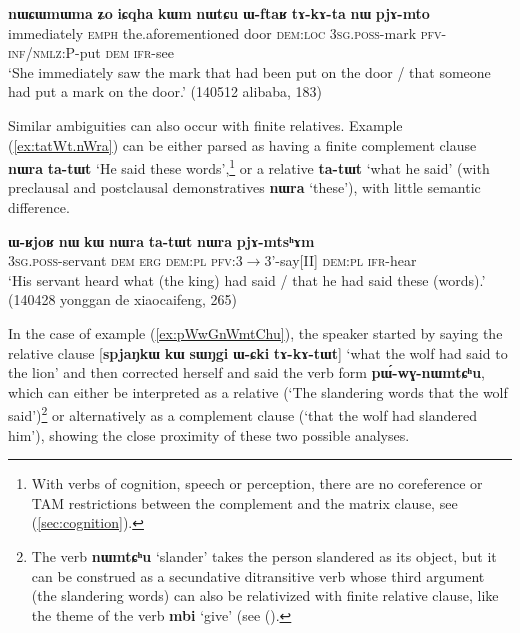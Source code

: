 \documentclass[oneside,a4paper,11pt]{article}
\newcommand{\ipa}[1]{\textbf{\phon#1}} %
\newcommand{\jpg}[2]{\ipa{#1} `#2'} %
\begin{document}
\begin{exe}
\ex  \label{ex:WftaR.tAkAta}
\gll 
\ipa{nɯɕɯmɯma} 	\ipa{ʑo} 	\ipa{iɕqha} 	\ipa{kɯm} 	\ipa{nɯtɕu} 	\ipa{ɯ-ftaʁ} 	\ipa{tɤ-kɤ-ta} 	\ipa{nɯ} 	\ipa{pjɤ-mto} \\
immediately \textsc{emph} the.aforementioned door \textsc{dem:loc} \textsc{3sg.poss}-mark \textsc{pfv-inf/nmlz:P}-put \textsc{dem} \textsc{ifr}-see \\
\glt `She immediately saw the mark that had been put on the door / that someone had put a mark on the door.' (140512 alibaba, 183)
\end{exe}

Similar ambiguities can also occur with finite relatives. Example (\ref{ex:tatWt.nWra}) can be either parsed as having a finite complement clause \ipa{nɯra} 	\ipa{ta-tɯt} `He said these words',\footnote{With verbs of cognition, speech or perception, there are no coreference or TAM restrictions between the complement and the matrix clause, see (\ref{sec:cognition}).} or a relative \ipa{ta-tɯt} `what he said' (with preclausal and postclausal demonstratives \ipa{nɯra} `these'), with little semantic difference.

\begin{exe}
\ex \label{ex:tatWt.nWra}
\gll \ipa{ɯ-ʁjoʁ} 	\ipa{nɯ} 	\ipa{kɯ} 	\ipa{nɯra} 	\ipa{ta-tɯt} 	\ipa{nɯra} 	\ipa{pjɤ-mtsʰɤm} \\
\textsc{3sg.poss}-servant \textsc{dem} \textsc{erg} \textsc{dem:pl} \textsc{pfv}:3$\rightarrow$3'-say[II] \textsc{dem:pl}  \textsc{ifr}-hear \\
\glt `His servant heard what (the king) had said / that he had said these (words).' (140428 yonggan de xiaocaifeng, 265)
\end{exe}

In the case of example (\ref{ex:pWwGnWmtChu}), the speaker started by saying the relative clause [\ipa{spjaŋkɯ} \ipa{kɯ} \ipa{sɯŋgi} \ipa{ɯ-ɕki} \ipa{tɤ-kɤ-tɯt}] `what the wolf had said to the lion' and then corrected herself and said the verb form \ipa{pɯ́-wɣ-nɯmtɕʰu}, which can either be interpreted as a relative (`The slandering words that the wolf said')\footnote{The verb \jpg{nɯmtɕʰu}{slander} takes the person slandered as its object, but it can be construed as a secundative ditransitive verb whose third argument (the slandering words) can also be relativized with finite relative clause, like the theme of the verb \jpg{mbi}{give} (see (\citealt[16-17]{jacques16relatives}).} or alternatively as a complement clause (`that the wolf had slandered him'), showing the close proximity of these two possible analyses.
\end{document}
